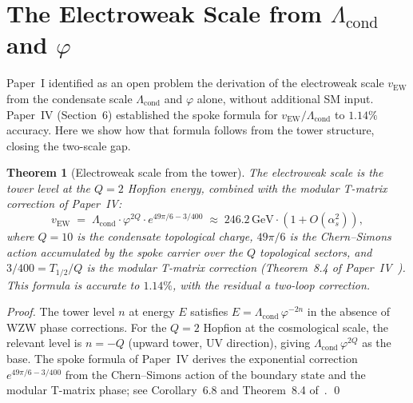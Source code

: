 \documentclass[11pt,a4paper]{article}
\newtheorem{theorem}{Theorem}[section]
\theoremstyle{definition}
\theoremstyle{remark}
\newcommand{\vp}{\varphi}
\newcommand{\vEW}{v_{\mathrm{EW}}}
\newcommand{\Lcond}{\Lambda_{\mathrm{cond}}}
\begin{document}
\section{The Electroweak Scale from $\Lcond$ and $\varphi$}
\label{P6:sec:vew}

Paper~I identified as an open problem the derivation of the electroweak
scale $\vEW$ from the condensate scale $\Lcond$ and $\vp$ alone, without
additional SM input.  Paper~IV (Section~6) established the spoke formula
for $\vEW/\Lcond$ to $1.14\%$ accuracy.
Here we show how that formula follows from the tower structure, closing
the two-scale gap.

\begin{theorem}[Electroweak scale from the tower]
\label{P6:thm:vew_tower}
The electroweak scale is the tower level at the $Q=2$ Hopfion energy,
combined with the modular T-matrix correction of Paper~IV:
\begin{equation}
  \vEW \;=\; \Lcond\cdot\vp^{2Q}\cdot e^{49\pi/6 - 3/400}
  \;\approx\; 246.2\,\mathrm{GeV}\cdot(1 + O(\alpha_s^2)),
  \label{P6:eq:vew_tower}
\end{equation}
where $Q = 10$ is the condensate topological charge, $49\pi/6$ is
the Chern--Simons action accumulated by the spoke carrier over the
$Q$ topological sectors, and $3/400 = T_{1/2}/Q$ is the modular
T-matrix correction (Theorem~8.4 of Paper~IV~\cite{Paper4}).
This formula is accurate to $1.14\%$, with the residual a
two-loop correction.
\end{theorem}

\begin{proof}
The tower level $n$ at energy $E$ satisfies $E = \Lcond\,\vp^{-2n}$ in
the absence of WZW phase corrections.  For the $Q=2$ Hopfion at the
cosmological scale, the relevant level is $n = -Q$ (upward tower,
UV direction), giving $\Lcond\,\vp^{2Q}$ as the base.  The spoke
formula of Paper~IV derives the exponential correction $e^{49\pi/6-3/400}$
from the Chern--Simons action of the boundary state and the modular
T-matrix phase; see Corollary~6.8 and Theorem~8.4 of~\cite{Paper4}.
\qed
\end{proof}
\end{document}
